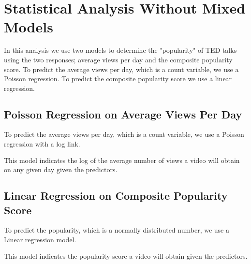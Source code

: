 \section{Statistical Analysis Without Mixed Models}
In this analysis we use two models to determine the "popularity" of TED talks using the two responses; average views per day and the composite popularity score. To predict the average views per day, which is a count variable, we use a Poisson regression. To predict the composite popularity score we use a linear regression.

\subsection{Poisson Regression on Average Views Per Day}
To predict the average views per day, which is a count variable, we use a Poisson regression with a log link. 

This model indicates the log of the average number of views a video will obtain on any given day given the predictors.
\subsection{Linear Regression on Composite Popularity Score}
To predict the popularity, which is a normally distributed number, we use a Linear regression model.

This model indicates the popularity score a video will obtain given the predictors.

